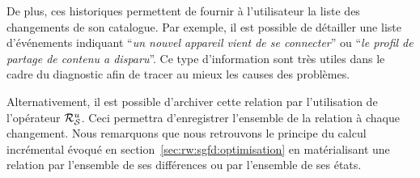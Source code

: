 De plus, ces historiques permettent de fournir à l'utilisateur la liste des changements de son catalogue. Par exemple, il est possible de détailler une liste d'événements indiquant \enquote{\it un nouvel appareil vient de se connecter} ou \enquote{\it le profil de partage de contenu a disparu}. Ce type d'information sont très utiles dans le cadre du diagnostic afin de tracer au mieux les causes des problèmes.

Alternativement, il est possible d'archiver cette relation par l'utilisation de l'opérateur $\mathcal{R}_{\mathcal S}^{u}$. Ceci permettra d'enregistrer l'ensemble de la relation à chaque changement. Nous remarquons que nous retrouvons le principe du calcul incrémental évoqué en section~\ref{sec:rw:sgfd:optimisation} en matérialisant une relation par l'ensemble de ses différences ou par l'ensemble de ses états.